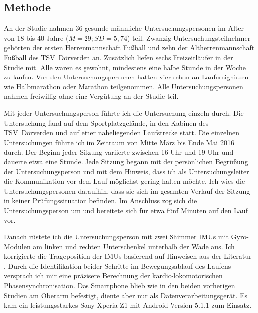 \subsection{Methode} 

\label{sub:methode_5_3}

An der Studie nahmen 36 gesunde männliche Untersuchungspersonen im Alter von 18 bis 40 Jahre ($M = 29; SD = 5{,}74$) teil. Zwanzig Untersuchungsteilnehmer gehörten der ersten Herrenmannschaft Fußball und zehn der Altherrenmannschaft Fußball des TSV~Dörverden an. Zusätzlich liefen sechs Freizeitläufer in der Studie mit. Alle waren es gewohnt, mindestens eine halbe Stunde in der Woche zu laufen. Von den Untersuchungspersonen hatten vier schon an Laufereignissen wie Halbmarathon oder Marathon teilgenommen. Alle Untersuchungspersonen nahmen freiwillig ohne eine Vergütung an der Studie teil. 

Mit jeder Untersuchungsperson führte ich die Untersuchung einzeln durch. Die Untersuchung fand auf dem Sportplatzgelände, in den Kabinen des TSV~Dörverden und auf einer naheliegenden Laufstrecke statt. Die einzelnen Untersuchungen führte ich im Zeitraum von Mitte März bis Ende Mai 2016 durch. Der Beginn jeder Sitzung variierte zwischen 16 Uhr und 19 Uhr und dauerte etwa eine Stunde. Jede Sitzung begann mit der persönlichen Begrüßung der Untersuchungsperson und mit dem Hinweis, dass ich als Untersuchungsleiter die Kommunikation vor dem Lauf möglichst gering halten möchte. Ich wies die Untersuchungspersonen daraufhin, dass sie sich im gesamten Verlauf der Sitzung in keiner Prüfungssituation befinden. Im Anschluss zog sich die Untersuchungsperson um und bereitete sich für etwa fünf Minuten auf den Lauf vor. 

Danach rüstete ich die Untersuchungsperson mit zwei Shimmer \acp{IMU} mit Gyro-Modulen am linken und rechten Unterschenkel unterhalb der Wade aus. Ich korrigierte die Trageposition der \acp{IMU} basierend auf Hinweisen aus der Literatur \citep{Hreljac1993}. Durch die Identifikation beider Schritte im Bewegungsablauf des Laufens versprach ich mir eine präzisere Berechnung der kardio-lokomotorischen Phasensynchronisation. Das Smartphone blieb wie in den beiden vorherigen Studien am Oberarm befestigt, diente aber nur als Datenverarbeitungsgerät. Es kam ein leistungsstarkes Sony Xperia Z1 mit Android Version 5.1.1 zum Einsatz.

